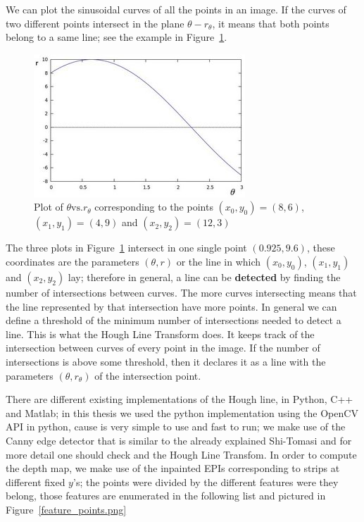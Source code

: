 \bigskip

We can plot the sinusoidal curves of all the points in an image. If the curves of two different points intersect in the plane $\theta-r_{\theta}$, it means that both points belong to a same line; see the example in Figure~\ref{fig:intersection-hough}.

\begin{figure}[h!]
\centering
\includegraphics[width = 0.8 \textwidth]{./Diagrams/family-lines-hough.jpg}
\caption{Plot of $\theta\textrm{vs.}r_{\theta}$ corresponding to the points $(x_0,y_0)=(8,6)$, $(x_1,y_1)=(4,9)$ and $(x_2,y_2)=(12,3)$}
\label{fig:intersection-hough}
\end{figure}

\bigskip

The three plots in Figure~\ref{fig:intersection-hough} intersect in one single point $(0.925,9.6)$, these coordinates are the parameters $(\theta,r)$ or the line in which $(x_0,y_0)$, $(x_1,y_1)$ and $(x_2,y_2)$ lay; therefore in general, a line can be \textbf{detected} by finding the number of intersections between curves. The more curves intersecting means that the line represented by that intersection have more points. In general we can define a threshold of the minimum number of intersections needed to detect a line. This is what the Hough Line Transform does. It keeps track of the intersection between curves of every point in the image. If the number of intersections is above some threshold, then it declares it as a line with the parameters $(\theta,r_{\theta})$ of the intersection point.

\bigskip 

There are different existing implementations of the Hough line, in Python, C++ and Matlab; in this thesis we used the python implementation using the OpenCV API in python, cause is very simple to use and fast to run; we make use of the Canny edge detector that is similar to the already explained Shi-Tomasi and for more detail one should check \cite{LearnOpenCV} and the Hough Line Transfom. In order to compute the depth map, we make use of the inpainted EPIs corresponding to strips at different fixed $y$'s; the points were divided by the different features were they belong, those features are enumerated in the following list and pictured in Figure~\ref{feature_points.png}

